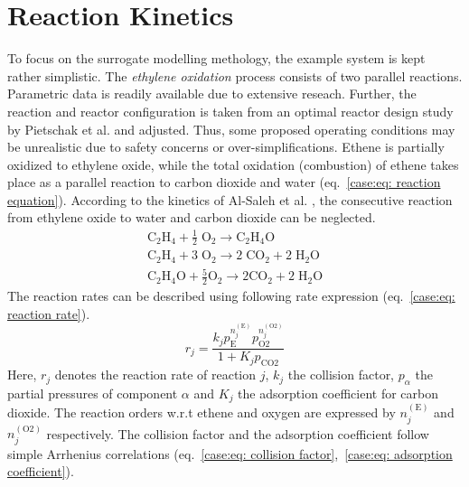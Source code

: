 \section{Reaction Kinetics}
To focus on the surrogate modelling methology, the example system is kept rather simplistic. 
The \emph{ethylene oxidation} process consists of two parallel reactions. Parametric data
is readily available due to extensive reseach. Further, the reaction and 
reactor configuration is taken from an optimal reactor design study by Pietschak et al. \cite{pietschak2018} and
adjusted. Thus, some proposed operating conditions may be unrealistic due to safety concerns
or over-simplifications.
\newline
\newline
Ethene is partially oxidized to ethylene oxide, while the total oxidation (combustion) of ethene takes place
as a parallel reaction to carbon dioxide and water (eq.~\ref{case:eq: reaction equation}). According to the kinetics of Al-Saleh et al. \cite{alsaleh1988},
the consecutive reaction from ethylene oxide to water and carbon dioxide can be neglected.
\begin{equation}
    \label{case:eq: reaction equation}
    \begin{gathered}
        \mathrm{C_2H_4} + \frac{1}{2} \; \mathrm{O_2} \rightarrow \mathrm{C_2H_4O} \\
        \mathrm{C_2H_4} + 3 \; \mathrm{O_2} \rightarrow 2 \; \mathrm{CO_2} + 2 \; \mathrm{H_2O} \\
        \mathrm{C_2H_4O} + \frac{5}{2} \mathrm{O_2} \rightarrow 2 \mathrm{CO_2} + 2 \; \mathrm{H_2O}
    \end{gathered}
\end{equation}
The reaction rates can be described using following rate expression (eq.~\ref{case:eq: reaction rate}).
\begin{equation}
    \label{case:eq: reaction rate}
    r_j = \frac{k_j p_\text{E}^{n_j^{(\text{E})}} p_\text{O2}^{n_j^{(\text{O2})}}}{1 + K_j p_\text{CO2}}
\end{equation}
Here, $r_j$ denotes the reaction rate of reaction $j$, $k_j$ the collision factor, $p_\alpha$ the partial pressures of
component $\alpha$ and $K_j$ the adsorption coefficient for carbon dioxide. 
The reaction orders w.r.t ethene and oxygen are expressed by $n_j^{(\text{E})}$ and $n_j^{(\text{O2})}$ respectively.
The collision factor and the adsorption
coefficient follow simple Arrhenius correlations (eq.~\ref{case:eq: collision factor},~\ref{case:eq: adsorption coefficient}).

